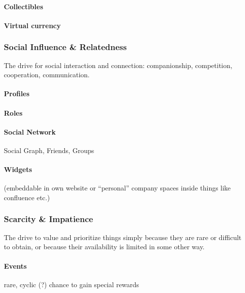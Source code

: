 \documentclass[runningheads]{llncs}
\begin{document}
\paragraph{Collectibles}

\paragraph{Virtual currency}

\subsubsection{Social Influence \& Relatedness\label{sec:social-influence-and-relatedness}}\cite{Chou15} The drive for social interaction and connection: companionship, competition, cooperation, communication.

\paragraph{Profiles}

\paragraph{Roles}

\paragraph{Social Network} Social Graph, Friends, Groups

\paragraph{Widgets} (embeddable in own website or \enquote{personal} company spaces inside things like confluence etc.)

\subsubsection{Scarcity \& Impatience\label{sec:scarcity-and-impatience}}\cite{Chou15} The drive to value and prioritize things simply because they are rare or difficult to obtain, or because their availability is limited in some other way.

\paragraph{Events} rare, cyclic (?) chance to gain special rewards~\cite{Herz14}
\end{document}
